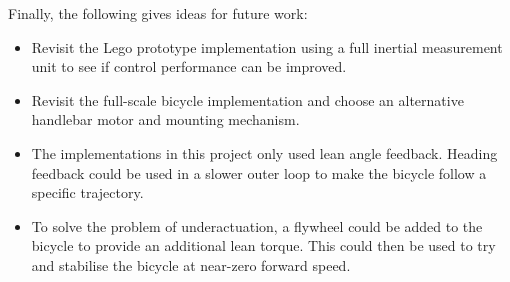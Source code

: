Finally, the following gives ideas for future work:

\begin{itemize}
\item{Revisit the Lego prototype implementation using a full inertial measurement unit to see if control performance can be improved.}
\item{Revisit the full-scale bicycle implementation and choose an alternative handlebar motor and mounting mechanism.}
\item{The implementations in this project only used lean angle feedback. Heading feedback could be used in a slower outer loop to make the bicycle follow a specific trajectory.}
\item{To solve the problem of underactuation, a flywheel could be added to the bicycle to provide an additional lean torque. This could then be used to try and stabilise the bicycle at near-zero forward speed.}
\end{itemize}
